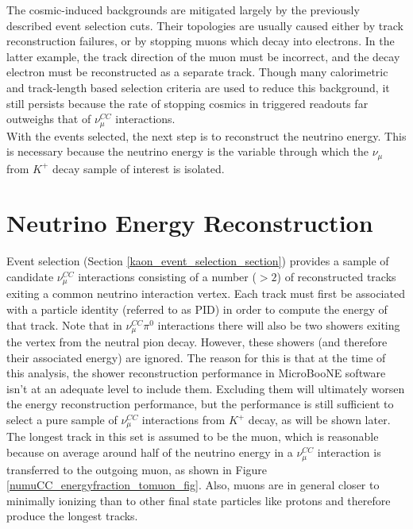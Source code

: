 The cosmic-induced backgrounds are mitigated largely by the previously described event selection cuts. Their topologies are usually caused either by track reconstruction failures, or by stopping muons which decay into electrons. In the latter example, the track direction of the muon must be incorrect, and the decay electron must be reconstructed as a separate track. Though many calorimetric and track-length based selection criteria are used to reduce this background, it still persists because the rate of stopping cosmics in triggered readouts far outweighs that of $\nu_\mu^{CC}$ interactions.\\

With the events selected, the next step is to reconstruct the neutrino energy. This is necessary because the neutrino energy is the variable through which the $\nu_\mu$ from $K^+$ decay sample of interest is isolated.

\section{Neutrino Energy Reconstruction}\label{kaon_nu_energy_section}

Event selection (Section \ref{kaon_event_selection_section}) provides a sample of candidate $\nu_\mu^{CC}$ interactions consisting of a number ($>2$) of reconstructed tracks exiting a common neutrino interaction vertex. Each track must first be associated with a particle identity (referred to as PID) in order to compute the energy of that track. Note that in $\nu_\mu^{CC}\pi^0$ interactions there will also be two showers exiting the vertex from the neutral pion decay. However, these showers (and therefore their associated energy) are ignored. The reason for this is that at the time of this analysis, the shower reconstruction performance in MicroBooNE software isn't at an adequate level to include them. Excluding them will ultimately worsen the energy reconstruction performance, but the performance is still sufficient to select a pure sample of $\nu_\mu^{CC}$ interactions from $K^+$ decay, as will be shown later.\\

The longest track in this set is assumed to be the muon, which is reasonable because on average around half of the neutrino energy in a $\nu_\mu^{CC}$ interaction is transferred to the outgoing muon, as shown in Figure \ref{numuCC_energyfraction_tomuon_fig}. Also, muons are in general closer to minimally ionizing than to other final state particles like protons and therefore produce the longest tracks.\\

